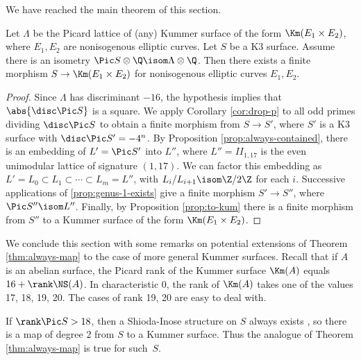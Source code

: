 \documentclass{article}
\begin{document}
We have reached the main theorem of this section.

\begin{thm}\label{thm:always-map} Let $\Lambda$ be the Picard lattice of (any) Kummer surface of the form $\Km(E_1\times E_2)$, where $E_1,E_2$ are nonisogenous elliptic curves.  Let $S$ be a K3 surface.  Assume there is an isometry $\Pic S\otimes\Q\isom  \Lambda\otimes\Q$.  Then there exists a finite morphism $S\to\Km(E_1\times E_2)$ for nonisogenous elliptic curves $E_1,E_2$.
\end{thm}

\begin{proof} Since $\Lambda$ has discriminant $-16$, the hypothesis implies that $\abs{\disc \Pic S}$ is a square.  We apply
  Corollary \ref{cor:drop-p} to all odd primes dividing $\disc \Pic S$ to obtain a finite morphism from $S\to S'$, where $S'$ is a K3 surface with $\disc \Pic S'=-4^n$.  By Proposition \ref{prop:always-contained}, there is an embedding of $L'=\Pic S'$ into $L''$, where $L''=II_{1,17}$ is the even unimodular lattice of signature $(1,17)$.  We can factor this embedding as $L'=L_0\subset L_1\subset\cdots\subset L_m=L''$, with $L_i/L_{i+1}\isom \Z/2\Z$ for each $i$.  Successive applications of  \ref{prop:genus-1-exists} give a finite morphism $S'\to S''$, where $\Pic S''\isom L''$.  Finally, by Proposition \ref{prop:to-kum} there is a finite morphism from $S''$ to a Kummer surface of the form $\Km(E_1\times E_2)$.
\end{proof}




We conclude this section with some remarks on potential extensions of Theorem \ref{thm:always-map} to the case of more general Kummer surfaces.  Recall that if $A$ is an abelian surface, the Picard rank of the Kummer surface $\Km(A)$ equals $16+\rank \NS(A)$.  In characteristic 0, the rank of $\Km(A)$ takes one of the values 17, 18, 19, 20.   The cases of rank 19, 20 are easy to deal with.


\begin{rmk}
  If $\rank \Pic S> 18$, then a Shioda-Inose structure on $S$ always exists
  \cite[Theorem 6.3, Corollary 6.4]{morr},
  so there is a map of degree $2$ from $S$ to a Kummer surface.
  Thus the analogue of Theorem \ref{thm:always-map} is true for such~$S$.

\end{rmk}
\end{document}
